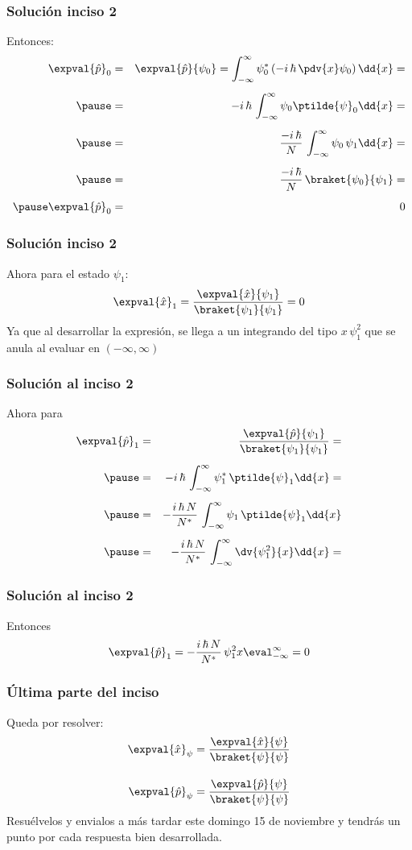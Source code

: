 \begin{frame}
\frametitle{Solución inciso 2}
\fontsize{12}{12}\selectfont
Entonces:
\begin{eqnarray*}
\expval{\hat{p}}_{0} &=& \expval{\hat{p}}{\psi_{0}} = \int_{-\infty}^{\infty} \psi_{0}^{*} \left( - i \, \hbar \, \pdv{x} \psi_{0} \right) \dd{x} = \\[0.5em] \pause
&=& -i \, \hbar \, \int_{-\infty}^{\infty} \psi_{0} \ptilde{\psi}_{0} \dd{x} = \\[0.5em] \pause
&=& \dfrac{-i \, \hbar}{N} \, \int_{-\infty}^{\infty} \psi_{0} \, \psi_{1} \dd{x} = \\[0.5em] \pause
&=& \dfrac{-i \, \hbar}{N} \, \braket{\psi_{0}}{\psi_{1}} = \\[0.5em] \pause
\expval{\hat{p}}_{0} &=& 0
\end{eqnarray*}
\end{frame}
\begin{frame}
\frametitle{Solución inciso 2}
Ahora para el estado $\psi_{1}$:
\\
\bigskip
\pause
\begin{align*}
\expval{\hat{x}}_{1} = \dfrac{\expval{\hat{x}}{\psi_{1}}}{\braket{\psi_{1}}{\psi_{1}}} = 0
\end{align*}
Ya que al desarrollar la expresión, se llega a un integrando del tipo $x \, \psi_{1}^{2}$ que se anula al evaluar en $(-\infty, \infty)$ 
\end{frame}
\begin{frame}
\frametitle{Solución al inciso 2}
Ahora para 
\begin{eqnarray*}
\expval{\hat{p}}_{1} &=& \dfrac{\expval{\hat{p}}{\psi_{1}}}{\braket{\psi_{1}}{\psi_{1}}} = \\[0.5em] \pause
&=& - i \, \hbar \, \int_{-\infty}^{\infty} \psi_{1}^{*} \, \ptilde{\psi}_{1} \dd{x} = \\[0.5em] \pause
&=& - \dfrac{i \, \hbar \, N}{N^{*}} \, \int_{-\infty}^{\infty} \psi_{1} \, \ptilde{\psi}_{1} \dd{x} \\[0.5em] \pause
&=& - \dfrac{i \, \hbar \, N}{N^{*}} \, \int_{-\infty}^{\infty} \dv{\psi_{1}^{2}}{x} \dd{x} = 
\end{eqnarray*}
\end{frame}
\begin{frame}
\frametitle{Solución al inciso 2}
Entonces
\begin{eqnarray*}
\expval{\hat{p}}_{1} = - \dfrac{i \, \hbar \, N}{N^{*}} \, \psi_{1}^{2}{x} \eval_{-\infty}^{\infty} = 0
\end{eqnarray*}
\end{frame}
\begin{frame}
\frametitle{Última parte del inciso}
Queda por resolver:
\begin{align*}
\expval{\hat{x}}_{\psi} &= \dfrac{\expval{\hat{x}}{\psi}}{\braket{\psi}{\psi}} \\[1em]
\expval{\hat{p}}_{\psi} &= \dfrac{\expval{\hat{p}}{\psi}}{\braket{\psi}{\psi}}
\end{align*}
\pause
Resuélvelos y envialos a más tardar este domingo 15 de noviembre y tendrás un punto por cada respuesta bien desarrollada.

\end{frame}
